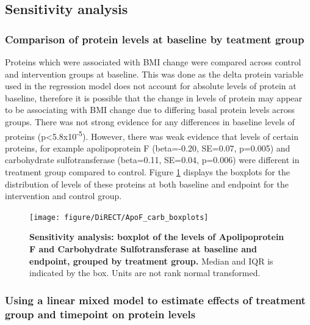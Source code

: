 \documentclass[11pt,twoside]{bristolthesis}
\begin{document}
\hypertarget{sensitivity-analysis}{%
\subsection{Sensitivity analysis}\label{sensitivity-analysis}}

\hypertarget{comparison-of-protein-levels-at-baseline-by-teatment-group}{%
\subsubsection{Comparison of protein levels at baseline by teatment group}\label{comparison-of-protein-levels-at-baseline-by-teatment-group}}

Proteins which were associated with BMI change were compared across control and intervention groups at baseline. This was done as the delta protein variable used in the regression model does not account for absolute levels of protein at baseline, therefore it is possible that the change in levels of protein may appear to be associating with BMI change due to differing basal protein levels across groups. There was not strong evidence for any differences in baseline levels of proteins (p\textless5.8x10\textsuperscript{-5}). However, there was weak evidence that levels of certain proteins, for example apolipoprotein F (beta=-0.20, SE=0.07, p=0.005) and carbohydrate sulfotransferase (beta=0.11, SE=0.04, p=0.006) were different in treatment group compared to control. Figure \ref{fig:ApoF-carb-boxplot} displays the boxplots for the distribution of levels of these proteins at both baseline and endpoint for the intervention and control group.



\begin{figure}

{\centering \texttt{[image: figure/DiRECT/ApoF\_carb\_boxplots]} 

}

\caption[Sensitivity analysis: boxplot of the levels of Apolipoprotein F and Carbohydrate Sulfotransferase at baseline and endpoint, grouped by treatment group.]{\textbf{Sensitivity analysis: boxplot of the levels of Apolipoprotein F and Carbohydrate Sulfotransferase at baseline and endpoint, grouped by treatment group.} Median and IQR is indicated by the box. Units are not rank normal transformed.}\label{fig:ApoF-carb-boxplot}
\end{figure}
\hypertarget{using-a-linear-mixed-model-to-estimate-effects-of-treatment-group-and-timepoint-on-protein-levels}{%
\subsubsection{Using a linear mixed model to estimate effects of treatment group and timepoint on protein levels}\label{using-a-linear-mixed-model-to-estimate-effects-of-treatment-group-and-timepoint-on-protein-levels}}
\end{document}
